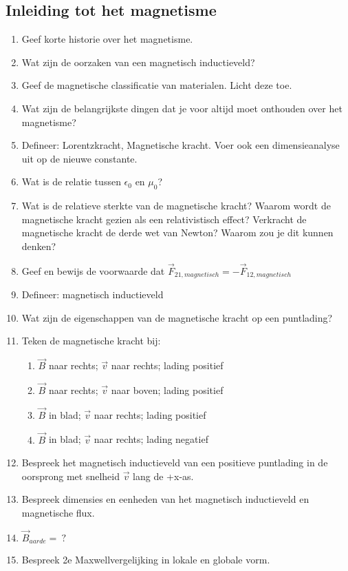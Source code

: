 \documentclass[a4paper,12pt]{article}
\begin{document}
    \subsection{Inleiding tot het magnetisme}
    \begin{enumerate}
        \item Geef korte historie over het magnetisme.
        \item Wat zijn de oorzaken van een magnetisch inductieveld?
        \item Geef de magnetische classificatie van materialen. Licht deze toe.
        \item Wat zijn de belangrijkste dingen dat je voor altijd moet onthouden over het magnetisme?
        \item Defineer: Lorentzkracht, Magnetische kracht. Voer ook een dimensieanalyse uit op de nieuwe constante.
        \item Wat is de relatie tussen $\epsilon_0$ en $\mu_0$?
        \item Wat is de relatieve sterkte van de magnetische kracht? Waarom wordt de magnetische kracht gezien als een relativistisch effect? Verkracht de magnetische kracht de derde wet van Newton? Waarom zou je dit kunnen denken?
        \item Geef en bewijs de voorwaarde dat $\vec{F}_{21,magnetisch} = -\vec{F}_{12,magnetisch}$
        \item Defineer: magnetisch inductieveld
        \item Wat zijn de eigenschappen van de magnetische kracht op een puntlading?
            \item Teken de magnetische kracht bij: 
            \begin{enumerate}
                \item $\vec{B}$ naar rechts; $\vec{v}$ naar rechts; lading positief
                \item $\vec{B}$ naar rechts; $\vec{v}$ naar boven; lading positief
                \item $\vec{B}$ in blad; $\vec{v}$ naar rechts; lading positief
                \item $\vec{B}$ in blad; $\vec{v}$ naar rechts; lading negatief
            \end{enumerate}
        \item Bespreek het magnetisch inductieveld van een positieve puntlading in de oorsprong met snelheid $\vec{v}$ lang de +x-as. 
        \item Bespreek dimensies en eenheden van het magnetisch inductieveld en magnetische flux.
        \item $\vec{B}_{aarde} =\: ?$
        \item Bespreek 2e Maxwellvergelijking in lokale en globale vorm.
    \end{enumerate}
\end{document}
